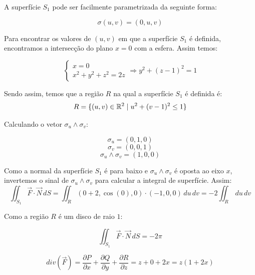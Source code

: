 \documentclass[12pt,a4paper]{article}
\begin{document}
A superfície $S_1$ pode ser facilmente parametrizada da seguinte forma:

\[ \sigma (u,v) = (0, u, v) \] 

Para encontrar os valores de $(u,v)$ em que a superfície $S_1$ é definida, encontramos a intersecção do plano $x=0$ com a esfera. Assim temos:

$$ \begin{cases}
x = 0 \\
x^2 + y^2 + z^2 = 2z
\end{cases}
\Rightarrow y^2 + (z-1)^2 = 1
$$

Sendo assim, temos que a região $R$ na qual a superfície $S_1$ é definida é:
$$ R = \{ (u,v) \in \mathbb{R}^2 \hspace{1 mm} | \hspace{1 mm}  u^2 + (v-1)^2 \leq 1 \} $$

Calculando o vetor $\sigma_u \wedge \sigma_v$:

\[ \sigma_u = (0,1, 0 ) \]
\[ \sigma_v = (0,0, 1 ) \]
\[  \sigma_u \wedge \sigma_v = ( 1, 0, 0 ) \] 

Como a normal da superfície $S_1$ é para baixo e $\sigma_u \wedge \sigma_v$ é oposta ao eixo $x$, invertemos o sinal de $\sigma_u \wedge \sigma_v$ para calcular a integral de superfície. Assim:
$$ \iint_{S_1} \vec{F}  \cdot \vec{N} \,dS = \iint_{R} (0 + 2 , \cos(0), 0 ) \cdot (-1, 0, 0) \,du \,dv = -2 \iint_{R}   \,du \,dv  $$

Como a região $R$ é um disco de raio $1$:


\begin{equation}
\iint_{S_1} \vec{F}  \cdot \vec{N} \,dS = -2\pi
\label{eq:2}
\end{equation}

$$ div(\vec{F}) =  \frac{\partial P}{\partial x} + \frac{\partial Q}{\partial y} + \frac{\partial R}{\partial z}  = z + 0 + 2x =  z(1+2x) $$
\end{document}
